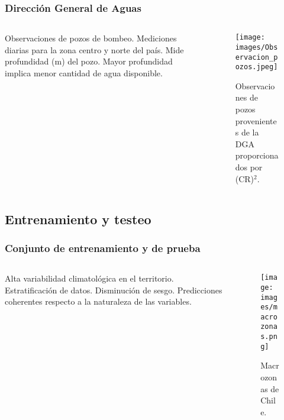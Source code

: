 \documentclass{beamer}
\begin{document}
  \begin{frame}
    \frametitle{Dirección General de Aguas}

    \begin{columns}
    
      \begin{column}{0.5\textwidth}
        \begin{outline}
          \1 Observaciones de pozos de bombeo.
          \1 Mediciones diarias para la zona centro y norte del país.
          \1 Mide profundidad (m) del pozo.
            \2 Mayor profundidad implica menor cantidad de agua disponible.
        \end{outline}
      \end{column}

      \begin{column}{0.5\textwidth}
        \begin{figure}
          \centering
          \texttt{[image: images/Observacion\_pozos.jpeg]}
          \caption{Observaciones de pozos provenientes de la DGA proporcionados por (CR)$^2$.}
        \end{figure}
      \end{column}

    \end{columns}
  \end{frame}


  \subsection*{Entrenamiento y testeo}

  \begin{frame}
    \frametitle{Conjunto de entrenamiento y de prueba}

    \begin{columns}

      \begin{column}{0.5\textwidth}
        \begin{outline}
          \1 Alta variabilidad climatológica en el territorio.
          \1 Estratificación de datos.
            \2 Disminución de sesgo.
            \2 Predicciones coherentes respecto a la naturaleza de las variables.
        \end{outline}
      \end{column}

      \begin{column}{0.5\textwidth}
        \begin{figure}
          \begin{center}
            \texttt{[image: images/macrozonas.png]}
          \end{center}
          \caption{Macrozonas de Chile.}
        \end{figure}
      \end{column}

    \end{columns}
  \end{frame}  
\end{document}
